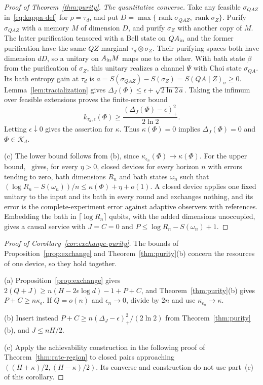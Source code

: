 \documentclass[11pt,a4paper]{article}
\theoremstyle{plain}
\theoremstyle{definition}
\theoremstyle{remark}
\DeclareMathOperator{\rank}{rank}
\begin{document}
\begin{proof}[Proof of Theorem~\ref{thm:purity}]
\emph{The quantitative converse.} Take any feasible $\sigma_{QAZ}$ in~\eqref{eq:kappa-def} for $\rho=\tau_d$, and put
$D=\max\{\rank\sigma_{QAZ},\rank\sigma_Z\}$. Purify $\sigma_{QAZ}$ with a memory $M$ of dimension $D$, and purify $\sigma_Z$ with another copy of $M$.
The latter purification tensored with a Bell state on $Q A_{\rm in}$ and the former purification have the same $QZ$ marginal
$\tau_d\otimes\sigma_Z$. Their purifying spaces both have dimension $dD$, so a unitary on $A_{\rm in}M$ maps one to the other.
With bath state $\beta$ from the purification of $\sigma_Z$, this unitary realizes a channel $\Psi$ with Choi state $\sigma_{QA}$.
Its bath entropy gain at $\tau_d$ is
$a=S(\sigma_{QAZ})-S(\sigma_Z)=S(QA\mid Z)_\sigma\ge0$.
Lemma~\ref{lem:tracialization} gives $\Delta_J(\Phi)\le\epsilon+\sqrt{2\ln2\,a}$. Taking the infimum over feasible extensions proves the finite-error bound
\[
k_{\tau_d,\epsilon}(\Phi)\ge\frac{(\Delta_J(\Phi)-\epsilon)_+^2}{2\ln2}.
\]
Letting $\epsilon\downarrow0$ gives the assertion for $\kappa$. Thus $\kappa(\Phi)=0$ implies $\Delta_J(\Phi)=0$ and $\Phi\in\mathcal K_d$.

(c) The lower bound follows from (b), since $\kappa_{\epsilon_n}(\Phi)\to\kappa(\Phi)$. For the upper bound,~\cite[Theorem~2.1]{Douglas2026closed} gives,
for every $\eta>0$, closed devices for every horizon $n$ with errors tending to zero, bath dimensions $R_n$ and bath states $\omega_n$ such that
$(\log R_n-S(\omega_n))/n\le\kappa(\Phi)+\eta+o(1)$. A closed device applies one fixed unitary to the input and its bath in every round and
exchanges nothing, and its error is the complete-experiment error against adaptive observers with references. Embedding the bath in
$\lceil\log R_n\rceil$ qubits, with the added dimensions unoccupied, gives a causal service with $J=C=0$ and $P\le\log R_n-S(\omega_n)+1$.
\end{proof}

\begin{proof}[Proof of Corollary~\ref{cor:exchange-purity}]
The bounds of Proposition~\ref{prop:exchange} and Theorem~\ref{thm:purity}(b) concern the resources of one device, so they hold together.

(a) Proposition~\ref{prop:exchange} gives $2(Q+J)\ge n(H-2\epsilon\log d)-1+P+C$, and Theorem~\ref{thm:purity}(b) gives $P+C\ge n\kappa_\epsilon$. If $Q=o(n)$ and
$\epsilon_n\to0$, divide by $2n$ and use $\kappa_{\epsilon_n}\to\kappa$.

(b) Insert instead $P+C\ge n(\Delta_J-\epsilon)_+^2/(2\ln2)$ from Theorem~\ref{thm:purity}(b), and $J\le nH/2$.

(c) Apply the achievability construction in the following proof of Theorem~\ref{thm:rate-region} to closed pairs approaching
$((H+\kappa)/2,(H-\kappa)/2)$. Its converse and construction do not use part~(c) of this corollary.
\end{proof}
\end{document}
